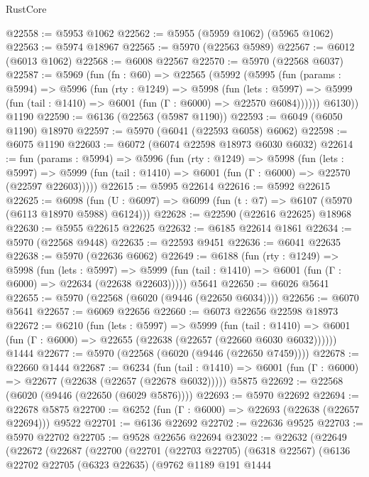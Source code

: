 \begin{lexlean}{RustCore}
\begin{coremodule}
@22558 := @5953 @1062
@22562 := @5955 (@5959 @1062) (@5965 @1062)
@22563 := @5974 @18967
@22565 := @5970 (@22563 @5989)
@22567 := @6012 (@6013 @1062)
@22568 := @6008 @22567
@22570 := @5970 (@22568 @6037)
@22587 := @5969
    (fun (fn : @60) =>
    @22565
      (@5992
        (@5995
          (fun (params : @5994) =>
          @5996
            (fun (rty : @1249) =>
            @5998
              (fun (lets : @5997) =>
              @5999 (fun (tail : @1410) => @6001 (fun (Γ : @6000) => @22570 @6084))))))
        @6130))
    @1190
@22590 := @6136 (@22563 (@5987 @1190))
@22593 := @6049 (@6050 @1190) @18970
@22597 := @5970 (@6041 (@22593 @6058) @6062)
@22598 := @6075 @1190
@22603 := @6072 (@6074 @22598 @18973 @6030 @6032)
@22614 := fun (params : @5994) =>
  @5996
    (fun (rty : @1249) =>
    @5998
      (fun (lets : @5997) =>
      @5999 (fun (tail : @1410) => @6001 (fun (Γ : @6000) => @22570 (@22597 @22603)))))
@22615 := @5995 @22614
@22616 := @5992 @22615
@22625 := @6098
    (fun (U : @6097) => @6099 (fun (t : @7) => @6107 (@5970 (@6113 @18970 @5988) @6124)))
@22628 := @22590 (@22616 @22625) @18968
@22630 := @5955 @22615 @22625
@22632 := @6185 @22614 @1861
@22634 := @5970 (@22568 @9448)
@22635 := @22593 @9451
@22636 := @6041 @22635
@22638 := @5970 (@22636 @6062)
@22649 := @6188
    (fun (rty : @1249) =>
    @5998
      (fun (lets : @5997) =>
      @5999 (fun (tail : @1410) => @6001 (fun (Γ : @6000) => @22634 (@22638 @22603)))))
    @5641
@22650 := @6026 @5641
@22655 := @5970 (@22568 (@6020 (@9446 (@22650 @6034))))
@22656 := @6070 @5641
@22657 := @6069 @22656
@22660 := @6073 @22656 @22598 @18973
@22672 := @6210
    (fun (lets : @5997) =>
    @5999
      (fun (tail : @1410) =>
      @6001 (fun (Γ : @6000) => @22655 (@22638 (@22657 (@22660 @6030 @6032))))))
    @1444
@22677 := @5970 (@22568 (@6020 (@9446 (@22650 @7459))))
@22678 := @22660 @1444
@22687 := @6234
    (fun (tail : @1410) => @6001 (fun (Γ : @6000) => @22677 (@22638 (@22657 (@22678 @6032)))))
    @5875
@22692 := @22568 (@6020 (@9446 (@22650 (@6029 @5876))))
@22693 := @5970 @22692
@22694 := @22678 @5875
@22700 := @6252 (fun (Γ : @6000) => @22693 (@22638 (@22657 @22694))) @9522
@22701 := @6136 @22692
@22702 := @22636 @9525
@22703 := @5970 @22702
@22705 := @9528 @22656 @22694
@23022 := @22632
    (@22649
      (@22672
        (@22687
          (@22700
            (@22701
              (@22703 @22705)
              (@6318 @22567)
              (@6136
                @22702
                @22705
                (@6323 @22635)
                (@9762
                  @1189
                  @191
                  @1444

\end{coremodule}
\end{lexlean}
